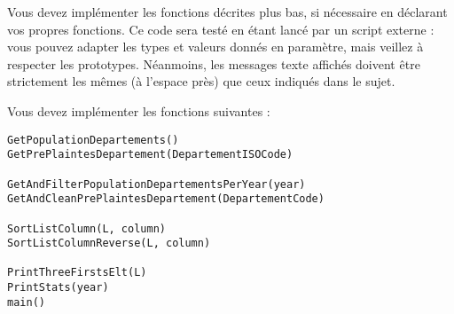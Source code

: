 

\bigskip

\noindent Vous devez implémenter les fonctions décrites plus bas, si nécessaire en déclarant vos propres fonctions.
Ce code sera testé en étant lancé par un script externe : vous pouvez adapter les types et valeurs donnés en paramètre, mais veillez à respecter les prototypes.
Néanmoins, les messages texte affichés doivent être strictement les mêmes (à l'espace près) que ceux indiqués dans le sujet.

\clearpage


\noindent Vous devez implémenter les fonctions suivantes :

\bigskip

\lstset{language=python}
\begin{lstlisting}[frame=single,title={Liste des fonctions à implémenter}]
GetPopulationDepartements()
GetPrePlaintesDepartement(DepartementISOCode)

GetAndFilterPopulationDepartementsPerYear(year)
GetAndCleanPrePlaintesDepartement(DepartementCode)

SortListColumn(L, column)
SortListColumnReverse(L, column)

PrintThreeFirstsElt(L)
PrintStats(year)
main()
\end{lstlisting}




\subsubsection*{}

